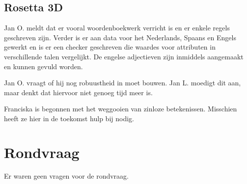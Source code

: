 \subsection {Rosetta 3D}
Jan O. meldt dat er vooral woordenboekwerk verricht is en er enkele regels 
geschreven zijn. Verder is er aan data voor het Nederlands, Spaans en Engels 
gewerkt en is er een checker geschreven die waardes voor attributen in 
verschillende talen vergelijkt. De engelse adjectieven zijn inmiddels 
aangemaakt en kunnen gevuld worden.

Jan O. vraagt of hij nog robuustheid in moet bouwen. Jan L. moedigt dit aan, 
maar denkt dat hiervoor niet genoeg tijd meer is.

Franciska is begonnen met het weggooien van zinloze betekenissen. Misschien 
heeft ze hier in de toekomst hulp bij nodig.

\section {Rondvraag}

Er waren geen vragen voor de rondvraag.


